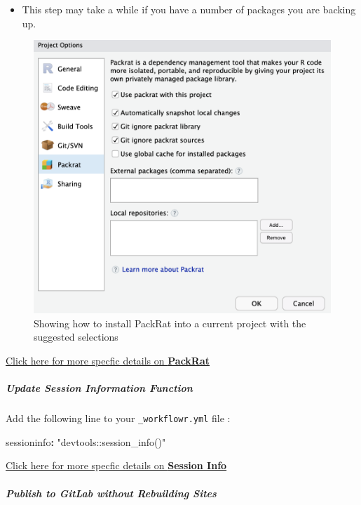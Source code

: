 \documentclass[openany]{article}
\newenvironment{Shaded}{\begin{snugshade}}{\end{snugshade}}
\newcommand{\NormalTok}[1]{#1}
\newcommand{\OperatorTok}[1]{\textcolor[rgb]{0.81,0.36,0.00}{\textbf{#1}}}
\newcommand{\StringTok}[1]{\textcolor[rgb]{0.31,0.60,0.02}{#1}}
\providecommand{\tightlist}{%
  \setlength{\itemsep}{0pt}\setlength{\parskip}{0pt}}
\let\oldsubparagraph\subparagraph
\renewcommand{\subparagraph}[1]{\oldsubparagraph{#1}\mbox{}}
\begin{document}
\begin{itemize}
\tightlist
\item
  This step may take a while if you have a number of packages you are backing up.
\end{itemize}

\begin{figure}

{\centering \includegraphics[width=0.6\linewidth]{images/Workflow_Photos/packRat} 

}

\caption{Showing how to install PackRat into a current project with the suggested selections}\label{fig:c999}
\end{figure}

\protect\hyperlink{adding-packrat-1}{Click here for more specfic details on \textbf{PackRat}}

\hypertarget{update-session-information-function}{%
\subparagraph{Update Session Information Function}\label{update-session-information-function}}

Add the following line to your \texttt{\_workflowr.yml} file :

\begin{Shaded}
\begin{Highlighting}[]
\NormalTok{sessioninfo}\OperatorTok{:}\StringTok{ "devtools::session_info()"}
\end{Highlighting}
\end{Shaded}

\protect\hyperlink{update-session-information-function-1}{Click here for more specfic details on \textbf{Session Info}}

\hypertarget{publish-to-gitlab-without-rebuilding-sites}{%
\subparagraph{Publish to GitLab without Rebuilding Sites}\label{publish-to-gitlab-without-rebuilding-sites}}
\end{document}
